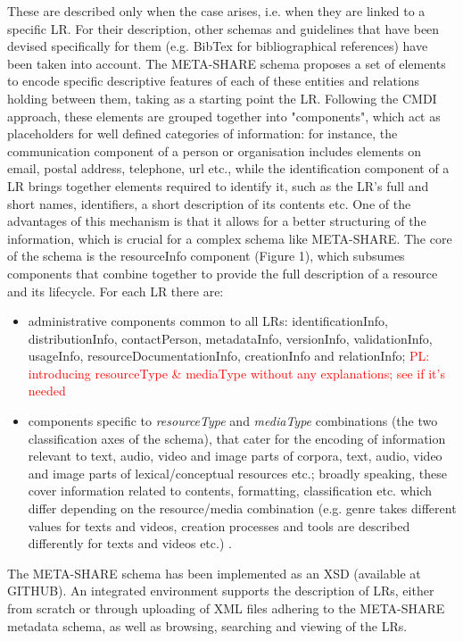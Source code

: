 \documentclass{llncs}
\begin{document}
These are described only when the case arises, i.e. when they are linked to a specific LR. For their description, other schemas and guidelines that have been devised specifically for them (e.g. BibTex for bibliographical references) have been taken into account.
The META-SHARE schema proposes a set of elements to encode specific descriptive features of each of these entities and relations holding between them, taking as a starting point the LR. Following the CMDI approach, these elements are grouped together into "components", which act as placeholders for well defined categories of information: for instance, the communication component of a person or organisation includes elements on email, postal address, telephone, url etc., while the identification component of a LR brings together elements required to identify it, such as the LR's full and short names, identifiers, a short description of its contents etc. One of the advantages of this mechanism is that it allows for a better structuring of the information, which is crucial for a complex schema like META-SHARE.
The core of the schema is the resourceInfo component (Figure 1), which subsumes components that combine together to provide the full description of a resource and its lifecycle. For each LR there are:
\begin{itemize}
\textcolor{red}{PL: instead of enumerating them, maybe I shoud just give a couple of examples}
\item administrative components common to all LRs: identificationInfo, distributionInfo, contactPerson, metadataInfo, versionInfo, validationInfo, usageInfo, resourceDocumentationInfo, creationInfo and relationInfo;
\textcolor{red}{PL: introducing resourceType & mediaType without any explanations; see if it's needed}
\item components specific to {\it resourceType} and {\it mediaType} combinations (the two classification axes of the schema), that cater for the encoding of information relevant to text, audio, video and image parts of corpora, text, audio, video and image parts of lexical/conceptual resources etc.; broadly speaking, these cover information related to contents, formatting, classification etc. which differ depending on the resource/media combination (e.g. genre takes different values for texts and videos, creation processes and tools are described differently for texts and videos etc.) .
\end{itemize}
The META-SHARE schema has been implemented as an XSD (available at {\hi GITHUB}). An integrated environment supports the description of LRs, either from scratch or through uploading of XML files adhering to the META-SHARE metadata schema, as well as browsing, searching and viewing of the LRs.
\end{document}
